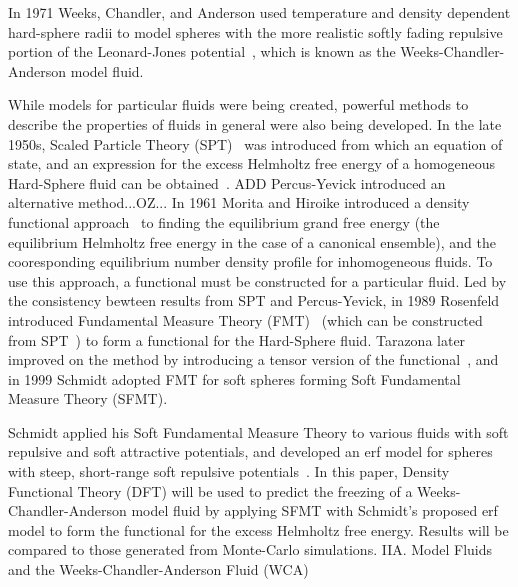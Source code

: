 \documentclass[12pt]{article}
\begin{document}
%
In 1971 Weeks, Chandler, and Anderson used temperature and density dependent hard-sphere 
radii to model spheres with the more realistic softly fading repulsive portion of the 
Leonard-Jones potential~\cite{andersen1971relationship}, which is known as the 
Weeks-Chandler-Anderson model fluid. 

While models for particular fluids were being created, powerful methods to describe the properties 
of fluids in general were also being developed. In the late 1950s, Scaled Particle 
Theory (SPT)~\cite{ReissSPT} was introduced from which an equation of state, and
an expression for the excess Helmholtz free energy of a homogeneous Hard-Sphere fluid can be 
obtained~\cite{Hansen}. \color{red}ADD Percus-Yevick introduced an alternative method...OZ... \color{black}
In 1961 Morita and Hiroike introduced a density functional approach~\cite{MoritaDFT} to finding the equilibrium grand free energy 
(the equilibrium Helmholtz free energy in the case of a canonical ensemble), and the cooresponding equilibrium 
number density profile for inhomogeneous fluids. To use this approach, a functional must be 
constructed for a particular fluid.
Led by the consistency bewteen results from SPT and Percus-Yevick, in 1989 Rosenfeld introduced Fundamental Measure Theory (FMT)~\cite{rosenfeld1989} 
(which can be constructed from SPT~\cite{santos2012phi3}) to form a functional for 
the Hard-Sphere fluid. 
Tarazona later improved on the method by introducing a tensor version of the 
functional~\cite{tarazonaphi3, santos2012phi3}, and in 1999 Schmidt adopted FMT for soft spheres 
forming Soft Fundamental Measure Theory (SFMT)\cite{schmidt1999density}. 

Schmidt applied his Soft Fundamental Measure Theory to various fluids with soft repulsive 
and soft attractive potentials, and developed an erf model for 
spheres with steep, short-range soft repulsive potentials~\cite{schmidt2000fluid}. In this paper, 
Density Functional Theory (DFT) will be used to predict the freezing of a 
Weeks-Chandler-Anderson model fluid by applying SFMT with Schmidt's proposed 
erf model to form the functional for the excess Helmholtz free energy. 
Results will be compared to those generated from Monte-Carlo simulations.
\newline
\newline
\noindent IIA. Model Fluids and the Weeks-Chandler-Anderson Fluid (WCA)
\end{document}
